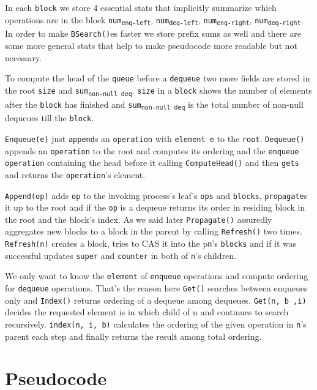 \documentclass[10pt]{article}
\theoremstyle{definition}
\begin{document}
In each \texttt{block} we store 4 essential stats that implicitly summarize which operations are in the block \texttt{num\textsubscript{enq-left}}, \texttt{num\textsubscript{deq-left}}, \texttt{num\textsubscript{enq-right}}, \texttt{num\textsubscript{deq-right}}. In order to make \texttt{BSearch()}es faster we store prefix sums as well and there are some more general stats that help to make pseudocode more readable but not necessary.

To compute the head of the \texttt{queue} before a \texttt{dequeue} two more fields are stored in the root \texttt{size} and \texttt{sum\textsubscript{non-null deq}}. \texttt{size} in a \texttt{block} shows the number of elements after the \texttt{block} has finished and \texttt{sum\textsubscript{non-null deq}} is the total number of non-null dequeues till the \texttt{block}.

\texttt{Enqueue(e)} just \texttt{append}s an \texttt{operation} with \texttt{element e} to the \texttt{root}. \texttt{Dequeue()} appends an \texttt{operation} to the root and computes its ordering and the \texttt{enqueue operation} containing the head before it calling \texttt{ComputeHead()} and then \texttt{gets} and returns the \texttt{operation}'s element.

\texttt{Append(op)} adds \texttt{op} to the invoking process's leaf's \texttt{ops} and \texttt{blocks}, \texttt{propagate}s it up to the root and if the \texttt{op} is a dequeue returns its order in residing block in the root and the block's index. As we said later \texttt{Propagate()} assuredly aggregates new blocks to a block in the parent by calling \texttt{Refresh()} two times. \texttt{Refresh(n)} creates a block, tries to CAS it into the p\texttt{n}'s \texttt{blocks} and if it was successful updates \texttt{super} and \texttt{counter} in both of \texttt{n}'s children.

We only want to know the \texttt{element} of \texttt{enqueue} operations and compute ordering for \texttt{dequeue} operations. That's the reason here \texttt{Get()} searches between enqueues only and \texttt{Index()} returns ordering of a dequeue among dequeues. \texttt{Get(n, b ,i)} decides the requested element is in which child of n and continues to search recursively. \texttt{index(n, i, b)} calculates the ordering of the given operation in \texttt{n}'s parent each step and finally returns the result among total ordering.



\pagebreak
\section{Pseudocode}
\end{document}
